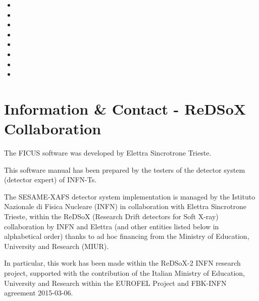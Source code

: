 \documentclass[a4paper,12pt,oneside,pdflatex,italian,final,twocolumn]{article}
\begin{document}
\begin{itemize}
    \item 
    \item 
    \item 
    \item 
    \item 
    \item 
    \item 
    \item 
\end{itemize}

\section{Information \& Contact - ReDSoX Collaboration}
        The FICUS software was developed by Elettra Sincrotrone Trieste.
        
        This software manual has been prepared by the testers of the detector system (detector expert) of INFN-Ts.
        
        The SESAME-XAFS detector system implementation is managed by the Istituto Nazionale di Fisica Nucleare (INFN) in collaboration with Elettra Sincrotrone Trieste, within the ReDSoX (Research Drift detectors for Soft X-ray) collaboration by INFN and Elettra (and other entities listed below in alphabetical order) thanks to ad hoc financing from the Ministry of Education, University and Research (MIUR).
	
        In particular, this work has been made within the ReDSoX-2 INFN research project, supported with the contribution of the Italian Ministry of Education, University and Research within the EUROFEL Project and FBK-INFN agreement 2015-03-06.
	
\end{document}
